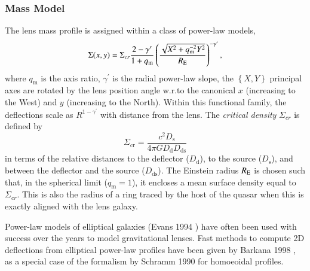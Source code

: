 \documentclass[a4paper,11pt]{article}
\def\qm{q_\mathrm{m}}
\begin{document}
{\subsubsection{Mass Model}

The lens mass profile is assigned within a class of power-law models,
%
\begin{equation}
\Sigma(x,y)=\Sigma_{cr}\frac{2-\gamma^{\prime}}{1+\qm}\left(\frac{\sqrt{ X^{2}+\qm^{-2}Y^{2}}}{R_{\rm E}}\right)^{-\gamma^{\prime}},
\end{equation}
%
where $q_\mathrm{m}$ is the axis ratio, $\gamma^{\prime}$ is the radial power-law
slope, the $\left\{X,Y\right\}$ principal axes are rotated by the lens position
angle w.r.to the canonical $x$ (increasing to the West) and $y$
(increasing to the North).  Within this functional family, the deflections scale as $R^{1-\gamma^{\prime}}$ with distance from the lens.
The \textit{critical density} $\Sigma_{cr}$ is defined by
%
\begin{equation}
\Sigma_{\mathrm{cr}} = \frac{c^{2}D_{\mathrm{s}}}{4\pi G D_{\mathrm{d}} D_{\mathrm{ds}}}
\end{equation}
%
in terms of the relative distances to the deflector ($D_{\mathrm{d}}$), to the
source ($D_{\mathrm{s}}$), and between the deflector and the source
($D_{\mathrm{ds}}$). The Einstein radius $R_{\rm{E}}$ is chosen such that, in the spherical limit ($\qm=1$),
 it encloses a mean surface density equal to $\Sigma_{cr}.$ This is also the radius of a ring traced by the host of
 the quasar when this is exactly aligned with the lens galaxy.

 Power-law models of elliptical galaxies (Evans 1994 \cite{1994MNRAS.267..333E}) have often been used with
success over the years to model gravitational lenses.
 Fast methods to compute 2D deflections from elliptical power-law profiles have been given by Barkana 1998
\cite{1998ApJ...502..531B}, as a special case of the formalism by Schramm 1990 \cite{1990A&A...231...19S} for homoeoidal profiles.
%
%

}
\end{document}
